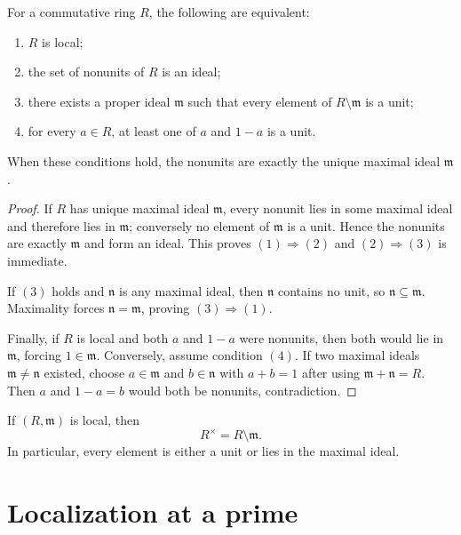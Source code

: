 \begin{theorem}
For a commutative ring $R$, the following are equivalent:
\begin{enumerate}
\item $R$ is local;
\item the set of nonunits of $R$ is an ideal;
\item there exists a proper ideal $\mathfrak m$ such that every element of
      $R\setminus\mathfrak m$ is a unit;
\item for every $a\in R$, at least one of $a$ and $1-a$ is a unit.
\end{enumerate}
When these conditions hold, the nonunits are exactly the unique maximal ideal $\mathfrak m$.
\end{theorem}

\begin{proof}
If $R$ has unique maximal ideal $\mathfrak m$, every nonunit lies in some maximal ideal and
therefore lies in $\mathfrak m$; conversely no element of $\mathfrak m$ is a unit.  Hence the
nonunits are exactly $\mathfrak m$ and form an ideal.  This proves $(1)\Rightarrow(2)$ and
$(2)\Rightarrow(3)$ is immediate.

If $(3)$ holds and $\mathfrak n$ is any maximal ideal, then $\mathfrak n$ contains no unit,
so $\mathfrak n\subseteq\mathfrak m$.  Maximality forces $\mathfrak n=\mathfrak m$, proving
$(3)\Rightarrow(1)$.

Finally, if $R$ is local and both $a$ and $1-a$ were nonunits, then both would lie in
$\mathfrak m$, forcing $1\in\mathfrak m$.  Conversely, assume condition $(4)$.  If two
maximal ideals $\mathfrak m\neq\mathfrak n$ existed, choose $a\in\mathfrak m$ and
$b\in\mathfrak n$ with $a+b=1$ after using $\mathfrak m+\mathfrak n=R$.  Then $a$ and
$1-a=b$ would both be nonunits, contradiction.
\end{proof}



\begin{corollary}
If $(R,\mathfrak m)$ is local, then
\[
R^\times=R\setminus\mathfrak m.
\]
In particular, every element is either a unit or lies in the maximal ideal.
\end{corollary}

\section{Localization at a prime}

